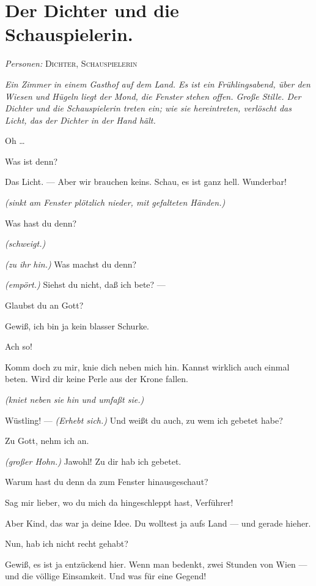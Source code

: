 \documentclass[
	final,
	a4paper,
	ngerman,
	mpinclude = true, %
	twoside = true,
	open = right,
	cleardoublepage = plain,
	DIV = 13,
	BCOR = 1cm,
	titlepage = firstiscover,
	]{scrbook}
\newcommand{\scene}{\section}
\newcommand{\direction}[1]{\textit{(#1)}}
\newcommand{\setting}[1]{\vspace{-0.5\baselineskip}\centering\textit{#1}}
\newcommand{\characterlist}[1]{{\begin{center}\textit{Personen:} #1\end{center}}}
\newcommand{\thecharacter}[1]{\textup{\textsc{#1}}\xspace}
\newcommand{\thedichter}{\thecharacter{Dichter}}
\newcommand{\theschauspielerin}{\thecharacter{Schauspielerin}}
\newcommand{\character}[1]{\item[#1:]}
\newcommand{\dichter}{\character{\thedichter}}
\newcommand{\schauspielerin}{\character{\theschauspielerin}}
\begin{document}
\scene{Der Dichter und die Schauspielerin.}
\characterlist{\thedichter, \theschauspielerin}
\setting{Ein Zimmer in einem Gasthof auf dem Land. Es ist ein Frühlingsabend, über den Wiesen und Hügeln liegt der Mond, die Fenster stehen offen. Große Stille. Der Dichter und die Schauspielerin treten ein; wie sie hereintreten, verlöscht das Licht, das der Dichter in der Hand hält.}
\begin{play}
	\dichter
	Oh \ldots{}

	\schauspielerin
	Was ist denn?

	\dichter
	Das Licht. --- Aber wir brauchen keins. Schau, es ist ganz hell. Wunderbar!

	\schauspielerin
	\direction{sinkt am Fenster plötzlich nieder, mit gefalteten Händen.}

	\dichter
	Was hast du denn?

	\schauspielerin
	\direction{schweigt.}

	\dichter
	\direction{zu ihr hin.} Was machst du denn?

	\schauspielerin
	\direction{empört.} Siehst du nicht, daß ich bete? ---

	\dichter
	Glaubst du an Gott?

	\schauspielerin
	Gewiß, ich bin ja kein blasser Schurke.

	\dichter
	Ach so!

	\schauspielerin
	Komm doch zu mir, knie dich neben mich hin. Kannst wirklich auch einmal beten. Wird dir keine Perle aus der Krone fallen.

	\dichter
	\direction{kniet neben sie hin und umfaßt sie.}

	\schauspielerin
	Wüstling! --- \direction{Erhebt sich.} Und weißt du auch, zu wem ich gebetet habe?

	\dichter
	Zu Gott, nehm ich an.

	\schauspielerin
	\direction{großer Hohn.} Jawohl! Zu dir hab ich gebetet.

	\dichter
	Warum hast du denn da zum Fenster hinausgeschaut?

	\schauspielerin
	Sag mir lieber, wo du mich da hingeschleppt hast, Verführer!

	\dichter
	Aber Kind, das war ja deine Idee. Du wolltest ja aufs Land --- und gerade hieher.

	\schauspielerin
	Nun, hab ich nicht recht gehabt?

	\dichter
	Gewiß, es ist ja entzückend hier. Wenn man bedenkt, zwei Stunden von Wien --- und die völlige Einsamkeit. Und was für eine Gegend!


\end{play}
\end{document}

